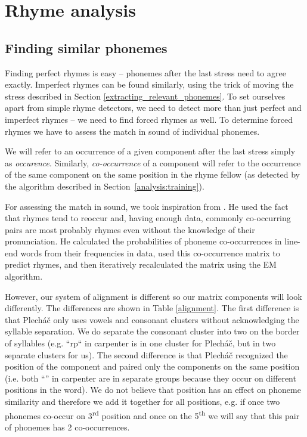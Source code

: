 \section{Rhyme analysis}
\subsection{Finding similar phonemes}
Finding perfect rhymes is easy -- phonemes after the last stress need to agree exactly. Imperfect rhymes can be found similarly, using the trick of moving the stress described in Section \ref{extracting_relevant_phonemes}.
To set ourselves apart from simple rhyme detectors, we need to detect more than just perfect and imperfect rhymes -- we need to find forced rhymes as well. To determine forced rhymes we have to assess the match in sound of individual phonemes.

We will refer to an occurrence of a given component after the last stress simply as \textit{occurence}. Similarly, \textit{co-occurrence} of a component will refer to the occurrence of the same component on the same position in the rhyme fellow (as detected by the algorithm described in Section~\ref{analysis:training}).

For assessing the match in sound, we took inspiration from \cite{plechavc2018collocation}. He used the fact that rhymes tend to reoccur and, having enough data, commonly co-occurring pairs are most probably rhymes even without the knowledge of their pronunciation. He calculated the probabilities of phoneme co-occurrences in line-end words from their frequencies in data, used this co-occurrence matrix to predict rhymes, and then iteratively recalculated the matrix using the EM algorithm.

However, our system of alignment is different so our matrix components will look differently. The differences are shown in Table \ref{alignment}. The first difference is that Plecháč only uses vowels and consonant clusters without acknowledging the syllable separation. We do separate the consonant cluster into two on the border of syllables (e.g. ``rp`` in carpenter is in one cluster for Plecháč, but in two separate clusters for us). The second difference is that Plecháč recognized the position of the component and paired only the components on the same position (i.e. both ``'' in carpenter are in separate groups because they occur on different positions in the word). We do not believe that position has an effect on phoneme similarity and therefore we add it together for all positions, e.g. if once two phonemes co-occur on 3\textsuperscript{rd} position and once on the 5\textsuperscript{th} we will say that this pair of phonemes has 2 co-occurrences.

